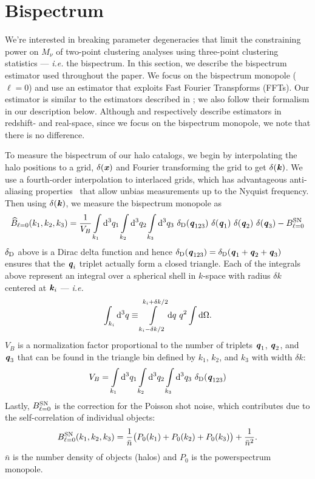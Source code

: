 \documentclass[12pt, letterpaper, preprint]{aastex62}
\newcommand{\smnu}{M_\nu}
\newcommand{\bfi}[1]{\textbf{\textit{#1}}}
\newcommand{\beq}{\begin{equation}}
\newcommand{\eeq}{\end{equation}}
\begin{document}
\section{Bispectrum} \label{sec:bk} 
We're interested in breaking parameter degeneracies that limit the constraining 
power on $\smnu$ of two-point clustering analyses using three-point clustering 
statistics --- \emph{i.e.} the bispectrum. In this section, we describe the 
bispectrum estimator used throughout the paper. We focus on the bispectrum monopole 
($\ell = 0$) and use an estimator that exploits Fast Fourier Transpforms (FFTs). 
Our estimator is similar to the estimators described in \cite{scoccimarro2015,sefusatti2016}; 
we also follow their formalism in our description below. Although \cite{sefusatti2016} 
and \cite{scoccimarro2015} respectively describe estimators in redshift- and real-space,  
since we focus on the bispectrum monopole, we note that there is no difference. 

To measure the bispectrum of our halo catalogs, we begin by interpolating the halo
positions to a grid, $\delta({\bfi x})$ and Fourier transforming the grid to get $\delta({\bfi k})$.
We use a fourth-order interpolation to interlaced grids, which has advantageous 
anti-aliasing properties~\citep{hockney1981,sefusatti2016} that allow unbias measurements 
up to the Nyquist frequency. Then using $\delta({\bfi k})$, we measure the bispectrum monopole as 
\beq \label{eq:bk} 
\widehat{B}_{\ell = 0}(k_1,k_2, k_3) = \frac{1}{V_B} \int\limits_{k_1}{\rm d}^3q_1 \int\limits_{k_2}{\rm d}^3q_2 \int\limits_{k_3}{\rm d}^3q_3~\delta_{\rm D}({\bfi q_{123}})~\delta({\bfi q_1})~\delta({\bfi q_2})~\delta({\bfi q_3}) - B^{\rm SN}_{\ell = 0}
\eeq
$\delta_{\rm D}$ above is a Dirac delta function and hence $\delta_{\rm D}({\bfi q_{123}}) = \delta_{\rm D}({\bfi q_1} + {\bfi q_2} + {\bfi q_3})$ 
ensures that the ${\bfi q}_i$ triplet actually form a closed triangle. Each of the integrals 
above represent an integral over a spherical shell in $k$-space with radius $\delta k$ 
centered at ${\bfi k}_i$ --- \emph{i.e.} 
\beq
\int_{k_i}{\rm d}^3q \equiv \int\limits_{k_i-\delta k/2}^{k_i+\delta k/2}{\rm d}q~q^2\int {\rm d}\Omega.
\eeq
$V_B$ is a normalization factor proportional to the number of triplets ${\bfi q_1}$, 
${\bfi q_2}$, and ${\bfi q_3}$ that can be found in the triangle bin defined by 
$k_1$, $k_2$, and $k_3$ with width $\delta k$: 
\beq
V_B = \int\limits_{k_1}{\rm d}^3q_1 \int\limits_{k_2}{\rm d}^3q_2 \int\limits_{k_3}{\rm d}^3q_3~\delta_{\rm D}({\bfi q_{123}})
\eeq
Lastly, $B^{\rm SN}_{\ell=0}$ is the correction for the Poisson shot noise, which 
contributes due to the self-correlation of individual objects: 
\beq \label{eq:bk_sn} 
B^{\rm SN}_{\ell=0}(k_1, k_2, k_3) = \frac{1}{\bar{n}} \big(P_0(k_1) + P_0(k_2) + P_0(k_3) \big) + \frac{1}{\bar{n}^2}. 
\eeq
$\bar{n}$ is the number density of objects (halos) and $P_0$ is the powerspectrum monopole. 
\end{document}
